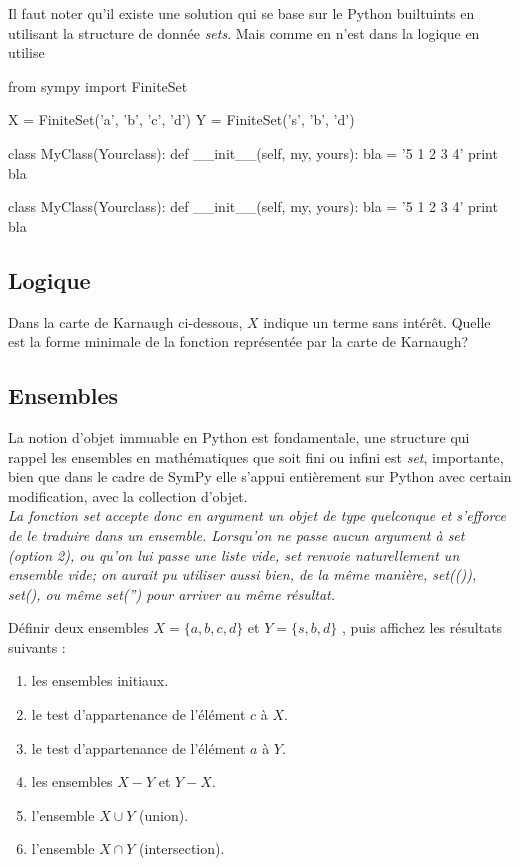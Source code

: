 \begin{solution}
Il faut noter qu'il existe une solution qui se base sur le Python builtuints en utilisant la structure de donnée \textit{sets}. Mais comme en n'est dans la logique en utilise 
\begin{python}
from sympy import FiniteSet

X = FiniteSet('a', 'b', 'c', 'd')
Y = FiniteSet('s', 'b', 'd')

class MyClass(Yourclass):
    def __init__(self, my, yours):
        bla = '5 1 2 3 4'
        print bla
\end{python}
\begin{python}
class MyClass(Yourclass):
    def __init__(self, my, yours):
        bla = '5 1 2 3 4'
        print bla
\end{python}

\end{solution}
\subsection{Logique}
\begin{exercise}
Dans la carte de Karnaugh ci-dessous, $X$ indique un terme sans intérêt. Quelle est la forme minimale de la fonction représentée par la carte de Karnaugh?
\end{exercise}
\subsection{Ensembles}
La notion d'objet immuable en Python est fondamentale,  une structure qui rappel les ensembles en mathématiques que soit fini ou infini est \textit{set}, importante, bien que
dans le cadre de SymPy elle s'appui entièrement sur Python avec certain modification, avec la collection d'objet.
\\

\textit{La fonction set accepte donc en argument un objet de type quelconque et s'efforce de le traduire dans un ensemble. Lorsqu'on ne passe aucun argument à set (option 2), ou qu'on lui passe une liste vide, set renvoie naturellement un ensemble vide; on aurait pu utiliser aussi bien, de la même manière, set(()), set({}), ou même set('') pour arriver au même résultat.}

	\begin{exercise}
		Définir deux ensembles $X = \lbrace a, b, c, d\rbrace$ et  $Y = \lbrace s, b, d\rbrace$ , puis 			affichez les résultats suivants :
 		\begin{enumerate}
  			 \item les ensembles initiaux.
  			 \item le test d’appartenance de l’élément $c$ à $X$.
  			 \item le test d’appartenance de l’élément $a$ à $Y$.
  			 \item les ensembles $X - Y$ et $Y - X$.
  			 \item l’ensemble $X \cup Y$ (union).
  			 \item l'ensemble $X \cap Y$ (intersection).
	 \end{enumerate}
	\end{exercise}

